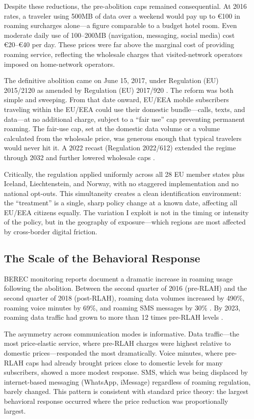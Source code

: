 \documentclass[12pt]{article}
\newcommand{\EUR}[1]{\euro#1}
\begin{document}
Despite these reductions, the pre-abolition caps remained consequential. At 2016 rates, a traveler using 500MB of data over a weekend would pay up to \EUR{100} in roaming surcharges alone---a figure comparable to a budget hotel room. Even moderate daily use of 100--200MB (navigation, messaging, social media) cost \EUR{20}--\EUR{40} per day. These prices were far above the marginal cost of providing roaming service, reflecting the wholesale charges that visited-network operators imposed on home-network operators.

The definitive abolition came on June 15, 2017, under Regulation (EU) 2015/2120 as amended by Regulation (EU) 2017/920 \citep{eurocommission2016}. The reform was both simple and sweeping. From that date onward, EU/EEA mobile subscribers traveling within the EU/EEA could use their domestic bundle---calls, texts, and data---at no additional charge, subject to a ``fair use'' cap preventing permanent roaming. The fair-use cap, set at the domestic data volume or a volume calculated from the wholesale price, was generous enough that typical travelers would never hit it. A 2022 recast (Regulation 2022/612) extended the regime through 2032 and further lowered wholesale caps \citep{eurocommission2022}.

Critically, the regulation applied uniformly across all 28 EU member states plus Iceland, Liechtenstein, and Norway, with no staggered implementation and no national opt-outs. This simultaneity creates a clean identification environment: the ``treatment'' is a single, sharp policy change at a known date, affecting all EU/EEA citizens equally. The variation I exploit is not in the timing or intensity of the policy, but in the geography of exposure---which regions are most affected by cross-border digital friction.

\subsection{The Scale of the Behavioral Response}

BEREC monitoring reports document a dramatic increase in roaming usage following the abolition. Between the second quarter of 2016 (pre-RLAH) and the second quarter of 2018 (post-RLAH), roaming data volumes increased by 490\%, roaming voice minutes by 69\%, and roaming SMS messages by 30\% \citep{berec2018, berec2019}. By 2023, roaming data traffic had grown to more than 12 times pre-RLAH levels \citep{berec2024}.

The asymmetry across communication modes is informative. Data traffic---the most price-elastic service, where pre-RLAH charges were highest relative to domestic prices---responded the most dramatically. Voice minutes, where pre-RLAH caps had already brought prices close to domestic levels for many subscribers, showed a more modest response. SMS, which was being displaced by internet-based messaging (WhatsApp, iMessage) regardless of roaming regulation, barely changed. This pattern is consistent with standard price theory: the largest behavioral response occurred where the price reduction was proportionally largest.
\end{document}
